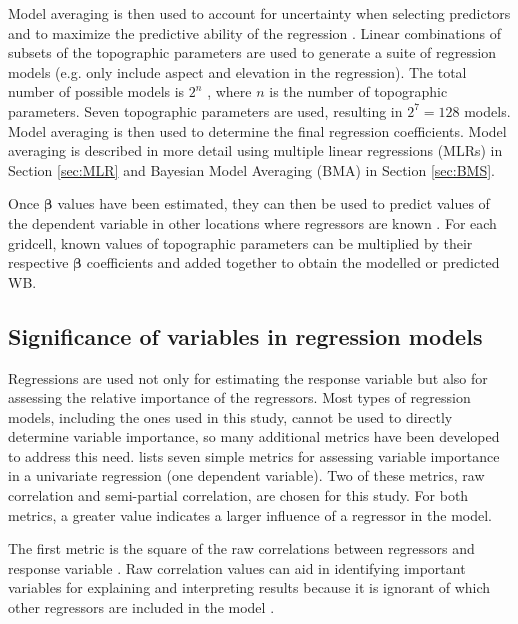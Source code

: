 \documentclass{sfuthesis}
\begin{document}
Model averaging is then used to account for uncertainty when selecting predictors and to maximize the predictive ability of the regression \citep{Madigan1994}. Linear combinations of subsets of the topographic parameters are used to generate a suite of regression models (e.g. only include aspect and elevation in the regression). The total number of possible models is $2^n$ , where $n$ is the number of topographic parameters. Seven topographic parameters are used, resulting in $2^7 = 128$ models. Model averaging is then used to determine the final regression coefficients. Model averaging is described in more detail using multiple linear regressions (MLRs) in Section \ref{sec:MLR} and Bayesian Model Averaging (BMA) in Section \ref{sec:BMS}.

Once $\bm{\beta}$ values have been estimated, they can then be used to predict values of the dependent variable in other locations where regressors are known \citep{Davis1986}. For each gridcell, known values of topographic parameters can be multiplied by their respective $\bm{\beta}$ coefficients and added together to obtain the modelled or predicted WB.

\subsection{Significance of variables in regression models}

Regressions are used not only for estimating the response variable but also for assessing the relative importance of the regressors. Most types of regression models, including the ones used in this study, cannot be used to directly determine variable importance, so many additional metrics have been developed to address this need. \cite{Gromping2015} lists seven simple metrics for assessing variable importance in a univariate regression (one dependent variable). Two of these metrics, raw correlation and semi-partial correlation, are chosen for this study. For both metrics, a greater value indicates a larger influence of a regressor in the model.

The first metric is the square of the raw correlations between regressors and response variable \citep{Gromping2015}. Raw correlation values can aid in identifying important variables for explaining and interpreting results because it is ignorant of which other regressors are included in the model \citep{Darlington1968}. 
\end{document}
